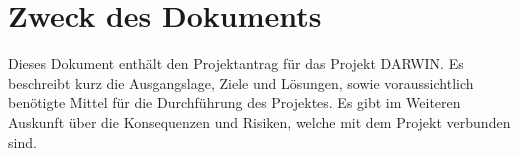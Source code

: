 \section{Zweck des Dokuments}
Dieses Dokument enthält den Projektantrag für das Projekt DARWIN. Es beschreibt kurz die Ausgangslage, Ziele und Lösungen, sowie voraussichtlich benötigte Mittel für die Durchführung des Projektes. Es gibt im Weiteren Auskunft über die Konsequenzen und Risiken, welche mit dem Projekt verbunden sind.